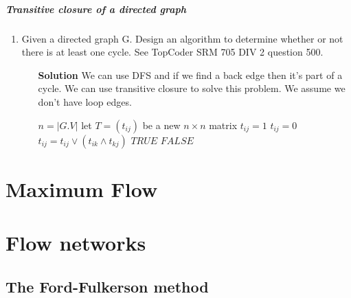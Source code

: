 \documentclass{book}
\begin{document}
	\paragraph{Transitive closure of a directed graph}
	\begin{enumerate}
		\item Given a directed graph G. Design an algorithm to determine whether or not there is at least one cycle. See TopCoder SRM 705 DIV 2 question 500.
		\begin{itemize}
			\item[\textbf{Solution}] We can use DFS and if we find a back edge then it's part of a cycle. We can use transitive closure to solve this problem. We assume we don't have loop edges.
			\begin{algorithm*}[h!]
				\begin{algorithmic}
						\State $n = |G.V|$
						\State let $T = (t_{ij})$ be a new $n \times n$ matrix
									\State $t_{ij} = 1$
								\Else
									\State $t_{ij} = 0$								
								\EndIf
							\EndFor
						\EndFor
									\State $t_{ij} = t_{ij} \lor (t_{ik} \land t_{kj})$
								\EndFor
							\EndFor
						\EndFor
								\State \Return $TRUE$
							\EndIf
						\EndFor
						\State \Return $FALSE$
					\EndFunction
				\end{algorithmic}
			\end{algorithm*}
		\end{itemize}
	\end{enumerate}
		
	\chapter{Maximum Flow}
	\chapter{Flow networks}
	\section{The Ford-Fulkerson method}
\end{document}
